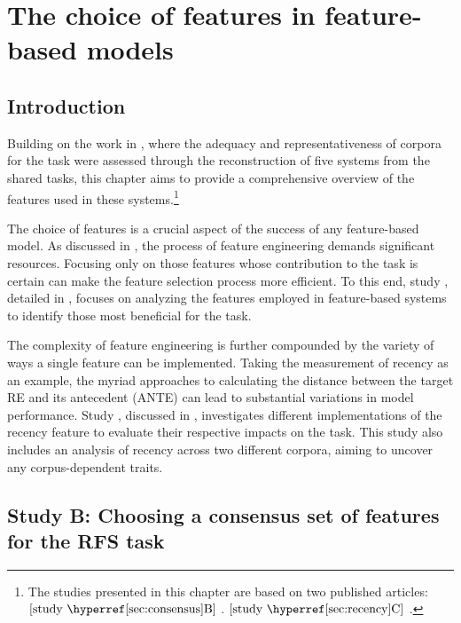 \chapter{The choice of features in feature-based \context models}\label{chap5}

\section{Introduction}\label{sec:intro}

Building on the work in , where the adequacy and representativeness of corpora for the \context task were assessed through the reconstruction of five systems from the \grec shared tasks, this chapter aims to provide a comprehensive overview of the features used in these systems.\footnote{The studies presented in this chapter are based on two published articles: $[\text{study \studB{}}]$ . $[\text{study \studC{}}]$ .}

The choice of features is a crucial aspect of the success of any feature-based \context model. As discussed in , the process of feature engineering demands significant resources. Focusing only on those features whose contribution to the task is certain can make the feature selection process more efficient. To this end, study \studB, detailed in , focuses on analyzing the features employed in feature-based systems to identify those most beneficial for the \context task.

The complexity of feature engineering is further compounded by the variety of ways a single feature can be implemented. Taking the measurement of recency as an example, the myriad approaches to calculating the distance between the target RE and its antecedent (ANTE) can lead to substantial variations in model performance. Study \studC, discussed in , investigates different implementations of the recency feature to evaluate their respective impacts on the \context task. This study also includes an analysis of recency across two different corpora, aiming to uncover any corpus-dependent traits.

\section{Study B: Choosing a consensus set of features for the RFS task}\label{sec:consensus}

